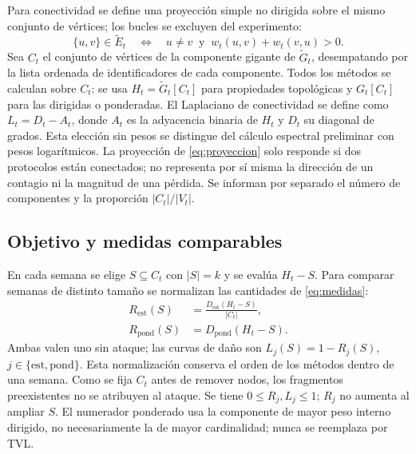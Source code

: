 \documentclass[journal]{IEEEtran}
\begin{document}
Para conectividad se define una proyección simple no dirigida sobre el mismo
conjunto de vértices; los bucles se excluyen del experimento:
\begin{equation}
\{u,v\}\in\tilde E_t
\quad\Longleftrightarrow\quad
u\ne v\ \text{ y }\ w_t(u,v)+w_t(v,u)>0.
\label{eq:proyeccion}
\end{equation}
Sea $C_t$ el conjunto de vértices de la componente gigante de $\tilde G_t$,
desempatando por la lista ordenada de identificadores de cada componente.
Todos los métodos se calculan sobre $C_t$: se usa $H_t=\tilde G_t[C_t]$
para propiedades topológicas y $G_t[C_t]$ para las dirigidas o ponderadas.
El Laplaciano de conectividad se define como $L_t=D_t-A_t$, donde $A_t$ es
la adyacencia binaria de $H_t$ y $D_t$ su diagonal de grados. Esta elección
sin pesos se distingue del cálculo espectral preliminar con pesos logarítmicos.
La proyección de
\eqref{eq:proyeccion} solo responde si dos protocolos están conectados; no
representa por sí misma la dirección de un contagio ni la magnitud de una
pérdida. Se informan por separado el número de componentes y la proporción
$|C_t|/|V_t|$.

\subsection{Objetivo y medidas comparables}

En cada semana se elige $S\subseteq C_t$ con $|S|=k$ y se evalúa $H_t-S$.
Para comparar semanas de distinto tamaño se normalizan las cantidades de
\eqref{eq:medidas}:
\begin{equation}
\begin{aligned}
R_{\mathrm{est}}(S)&=
\frac{D_{\mathrm{est}}(H_t-S)}{|C_t|},\\
R_{\mathrm{pond}}(S)&=D_{\mathrm{pond}}(H_t-S).
\end{aligned}
\label{eq:retencion}
\end{equation}
Ambas valen uno sin ataque; las curvas de daño son
$L_j(S)=1-R_j(S)$, $j\in\{\mathrm{est},\mathrm{pond}\}$. Esta
normalización conserva el orden de los métodos dentro de una semana. Como se
fija $C_t$ antes de remover nodos, los fragmentos preexistentes no se atribuyen
al ataque. Se tiene $0\leq R_j,L_j\leq1$; $R_j$ no aumenta al ampliar $S$.
El numerador ponderado usa la componente de mayor peso interno dirigido,
no necesariamente la de mayor cardinalidad; nunca se reemplaza por TVL.
\end{document}
